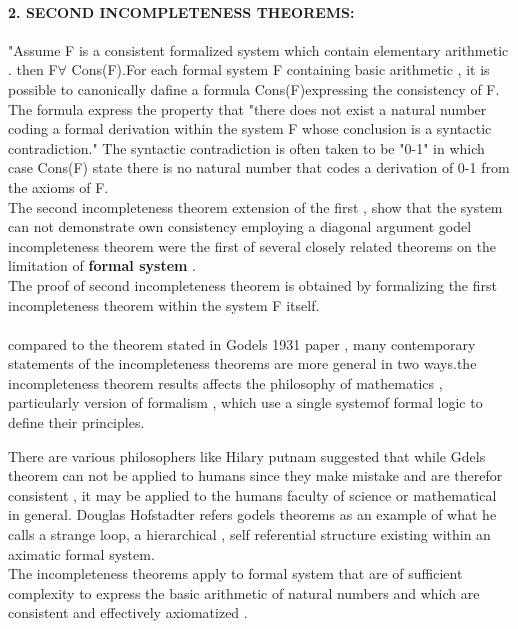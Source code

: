 \documentclass[a4 paper]{article}
\begin{document}
\paragraph{\textbf{2. SECOND INCOMPLETENESS THEOREMS:}}
"Assume F is a consistent formalized system which contain elementary arithmetic . then F$\forall  $ Cons(F).For each formal system F containing basic arithmetic , it is possible to canonically dafine a formula Cons(F)expressing the consistency of F. The formula express the property that "there does not exist a natural number coding a formal derivation within the system F whose conclusion is a syntactic contradiction." The syntactic contradiction is often taken to be "0-1" in which case Cons(F) state there is no natural number that codes a derivation of 0-1 from the axioms of F. 
\\
The second incompleteness theorem extension of the first , show that the system can not demonstrate own consistency employing a diagonal argument godel incompleteness theorem were the first of several closely related theorems on the limitation of \textbf{formal system} .
\\
The proof of second incompleteness theorem is obtained by formalizing the first incompleteness theorem within the system F itself.
\paragraph{}

compared to the theorem stated in Godels 1931 paper , many contemporary statements of the incompleteness theorems are more general in two ways.the incompleteness theorem results affects the philosophy of mathematics , particularly  version of formalism , which use a single systemof formal logic to define their principles.

There are various philosophers like Hilary putnam suggested that while Gdels theorem can not be applied to humans since they make mistake and are therefor consistent , it may be applied to the humans faculty of science or mathematical in general. Douglas Hofstadter refers godels  theorems as an example of what he calls a strange loop, a hierarchical , self referential structure existing within an aximatic formal system.
\\
The incompleteness theorems apply to formal system that are of sufficient complexity to express the basic arithmetic of natural numbers and which are consistent and effectively axiomatized . 
\end{document}
